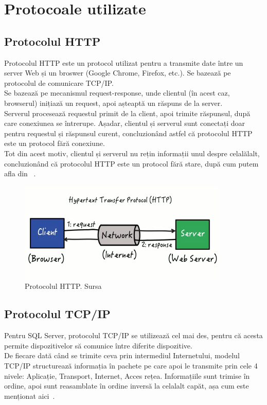 \section{Protocoale utilizate}
\subsection{Protocolul HTTP}
Protocolul HTTP este un protocol utilizat pentru a transmite date între un server Web și un broswer (Google Chrome, Firefox, etc.). Se bazează pe protocolul de comunicare TCP/IP.\\
Se bazează pe mecanismul request-response, unde clientul (în acest caz, browserul) inițiază un request, apoi așteaptă un răspuns de la server.\\
Serverul procesează requestul primit de la client, apoi trimite răspunsul, după care conexiunea se întrerupe. Așadar, clientul și serverul sunt conectați doar pentru requestul și răspunsul curent, concluzionând astfel că 
protocolul HTTP este un protocol fără conexiune.\\
Tot din acest motiv, clientul și serverul nu rețin informații unul despre celalălalt, concluzionând că protocolul HTTP este un protocol fără stare, după cum putem afla din ~\cite{HTTPDefinition}.
\begin{figure}[H]
	\centering
	\includegraphics[width=100mm, scale=1]{figs/http.png}
    \caption{Protocolul HTTP. Sursa~\cite{HTTPDiagram}}
	\label{fig:http}
\end{figure}

\subsection{Protocolul TCP/IP}
Pentru SQL Server, protocolul TCP/IP se utilizează cel mai des, pentru că acesta permite dispozitivelor să comunice între diferite dispozitive.\\
De fiecare dată când se trimite ceva prin intermediul Internetului, modelul TCP/IP structurează informația în pachete pe care apoi le transmite prin cele 4 nivele: Aplicație, Transport, Internet, Acces rețea.
Informațiile sunt trimise în ordine, apoi sunt reasamblate în ordine inversă la celalalt capăt, așa cum este menționat aici~\cite{TCPDefinition}.\\

